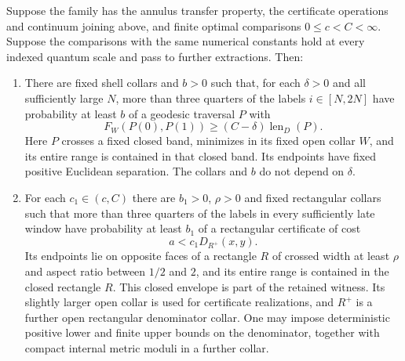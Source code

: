 \begin{proposition}[Amplification]
\label{comp:amplification}
Suppose the family has the annulus transfer property, the certificate
operations and continuum joining above, and finite optimal comparisons
$0\le c<C<\infty$.  Suppose the comparisons with the same numerical
constants hold at every indexed quantum scale and pass to further
extractions.  Then:
\begin{enumerate}[label=(\roman*)]
\item There are fixed shell collars and $b>0$ such that, for each
$\delta>0$ and all sufficiently large $N$, more than three quarters of
the labels $i\in[N,2N]$ have probability at least $b$ of a geodesic
traversal $P$ with
\[
 F_W(P(0),P(1))\ge(C-\delta)\operatorname{len}_D(P).
\]
Here $P$ crosses a fixed closed band, minimizes in its fixed open collar
$W$, and its entire range is contained in that closed band.
Its endpoints have fixed positive Euclidean separation.
The collars and $b$ do not depend on $\delta$.
\item For each $c_1\in(c,C)$ there are $b_1>0$, $\rho>0$ and fixed
rectangular collars such that more than three quarters of the labels
in every sufficiently late window have probability at least $b_1$ of
a rectangular certificate of cost
\[
 a<c_1D_{R^+}(x,y).
\]
Its endpoints lie on opposite faces of a rectangle $R$ of crossed width
at least $\rho$ and aspect ratio between $1/2$ and $2$, and its entire
range is contained in the closed rectangle $R$.  This closed envelope
is part of the retained witness.  Its slightly larger open collar is
used for certificate realizations, and $R^+$ is a further open
rectangular denominator collar.  One may impose deterministic positive lower
and finite upper bounds on the denominator, together with compact
internal metric moduli in a further collar.
\end{enumerate}
\end{proposition}

